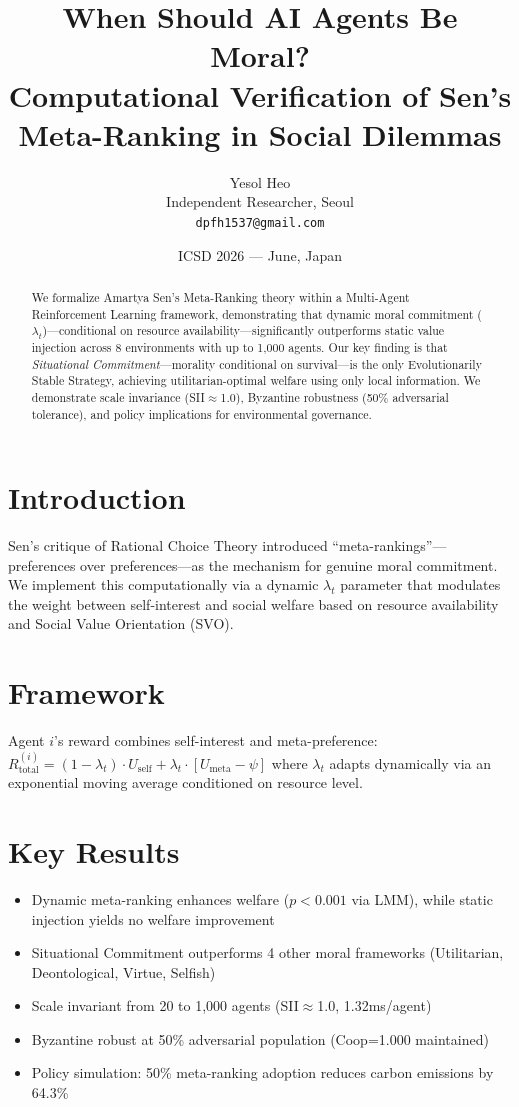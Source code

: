 \documentclass[12pt]{article}
\title{When Should AI Agents Be Moral?\\
Computational Verification of Sen's Meta-Ranking in Social Dilemmas}
\author{Yesol Heo\\
Independent Researcher, Seoul\\
\texttt{dpfh1537@gmail.com}}
\date{ICSD 2026 — June, Japan}
\begin{document}
\maketitle

\begin{abstract}
We formalize Amartya Sen's Meta-Ranking theory within a Multi-Agent Reinforcement Learning framework, demonstrating that dynamic moral commitment ($\lambda_t$)---conditional on resource availability---significantly outperforms static value injection across 8 environments with up to 1,000 agents. Our key finding is that \textit{Situational Commitment}---morality conditional on survival---is the only Evolutionarily Stable Strategy, achieving utilitarian-optimal welfare using only local information. We demonstrate scale invariance (SII$\approx$1.0), Byzantine robustness (50\% adversarial tolerance), and policy implications for environmental governance.
\end{abstract}

\section{Introduction}
Sen's \cite{sen1977rational} critique of Rational Choice Theory introduced ``meta-rankings''---preferences over preferences---as the mechanism for genuine moral commitment. We implement this computationally via a dynamic $\lambda_t$ parameter that modulates the weight between self-interest and social welfare based on resource availability and Social Value Orientation (SVO).

\section{Framework}
Agent $i$'s reward combines self-interest and meta-preference:
$R_{\text{total}}^{(i)} = (1-\lambda_t) \cdot U_{\text{self}} + \lambda_t \cdot [U_{\text{meta}} - \psi]$
where $\lambda_t$ adapts dynamically via an exponential moving average conditioned on resource level.

\section{Key Results}
\begin{itemize}
    \item Dynamic meta-ranking enhances welfare ($p<0.001$ via LMM), while static injection yields no welfare improvement
    \item Situational Commitment outperforms 4 other moral frameworks (Utilitarian, Deontological, Virtue, Selfish)
    \item Scale invariant from 20 to 1,000 agents (SII$\approx$1.0, 1.32ms/agent)
    \item Byzantine robust at 50\% adversarial population (Coop=1.000 maintained)
    \item Policy simulation: 50\% meta-ranking adoption reduces carbon emissions by 64.3\%
\end{itemize}
\end{document}
